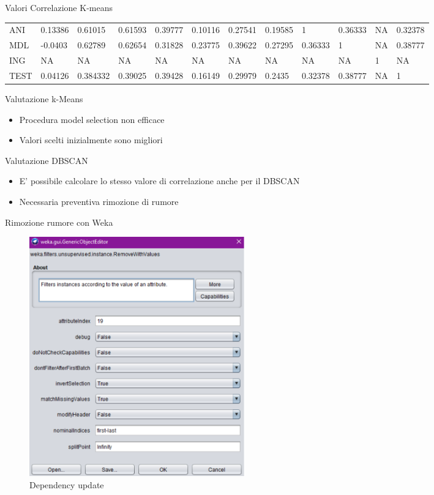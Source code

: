 \documentclass{beamer}
\begin{document}
\begin{frame}{Valori Correlazione K-means}
\begin{table}[H]
{\begin{tabular}{@{}llllllllllll@{}}
      ANI                & 0.13386  & 0.61015         & 0.61593             & 0.39777      & 0.10116  & 0.27541  & 0.19585 & 1       & 0.36333  & NA      & 0.32378 \\
      MDL                & -0.0403  & 0.62789         & 0.62654             & 0.31828      & 0.23775  & 0.39622  & 0.27295 & 0.36333 & 1        & NA      & 0.38777 \\
      ING                & NA       & NA              & NA                  & NA           & NA       & NA       & NA      & NA      & NA       & 1       & NA      \\ 
      TEST               & 0.04126  & 0.384332        & 0.39025             & 0.39428      & 0.16149  & 0.29979  & 0.2435  & 0.32378 & 0.38777  & NA      & 1       \\\bottomrule                 
      \end{tabular}
      }
  \end{table}
\end{frame}

\begin{frame}{Valutazione k-Means} 
    \begin{itemize}
      \item Procedura model selection non efficace
      \item Valori scelti inizialmente sono migliori
    \end{itemize} 
\end{frame}

\begin{frame}{Valutazione DBSCAN} 
  \begin{itemize}
    \item E' possibile calcolare lo stesso valore di correlazione anche per il DBSCAN
    \item Necessaria preventiva rimozione di rumore
  \end{itemize} 
\end{frame}

\begin{frame}{Rimozione rumore con Weka}
  \begin{figure}[bt]
    \begin{center}
    \includegraphics[width = 0.45\textwidth]{../img/filter-for-remove-noise.pdf}
    \caption{Dependency update}
    \end{center}
  \end{figure}
\end{frame}
\end{document}
